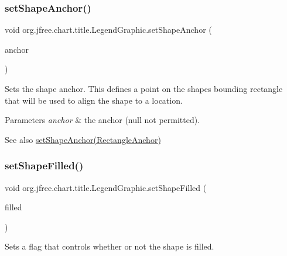 \subsubsection{\texorpdfstring{set\+Shape\+Anchor()}{setShapeAnchor()}}
{\footnotesize\ttfamily void org.\+jfree.\+chart.\+title.\+Legend\+Graphic.\+set\+Shape\+Anchor (\begin{DoxyParamCaption}\item[{Rectangle\+Anchor}]{anchor }\end{DoxyParamCaption})}

Sets the shape anchor. This defines a point on the shapes bounding rectangle that will be used to align the shape to a location.


\begin{DoxyParams}{Parameters}
{\em anchor} & the anchor ({\ttfamily null} not permitted).\\
\hline
\end{DoxyParams}
\begin{DoxySeeAlso}{See also}
\mbox{\hyperlink{classorg_1_1jfree_1_1chart_1_1title_1_1_legend_graphic_a392280321e9ef4cd9863829e3d147ba8}{set\+Shape\+Anchor(\+Rectangle\+Anchor)}} 
\end{DoxySeeAlso}
\mbox{\label{classorg_1_1jfree_1_1chart_1_1title_1_1_legend_graphic_ae11a7c5618cce84ce2e0614a1c033572}} 
\subsubsection{\texorpdfstring{set\+Shape\+Filled()}{setShapeFilled()}}
{\footnotesize\ttfamily void org.\+jfree.\+chart.\+title.\+Legend\+Graphic.\+set\+Shape\+Filled (\begin{DoxyParamCaption}\item[{boolean}]{filled }\end{DoxyParamCaption})}

Sets a flag that controls whether or not the shape is filled.


